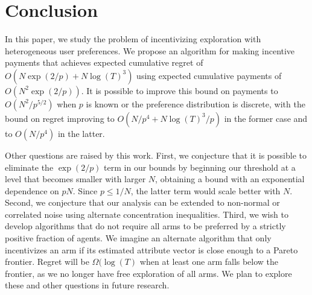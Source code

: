 \section{Conclusion}
In this paper, we study the problem of incentivizing exploration with heterogeneous user preferences.  We propose an algorithm for making incentive payments that achieves  expected cumulative regret of $O(N\exp(2/p) + N \log(T)^3)$ using expected cumulative payments of $O(N^2 \exp(2/p))$.  It is possible to improve this bound on payments to $O(N^2 / p^{5/2})$ when $p$ is known or the preference distribution is discrete, with the bound on regret improving to $O(N/p^4 + N \log(T)^3 / p)$ in the former case and to $O(N/p^4)$ in the latter.

Other questions are raised by this work.  First, we conjecture that it is possible to eliminate the $\exp(2/p)$ term in our bounds by beginning our threshold at a level that becomes smaller with larger $N$, obtaining a bound with an exponential dependence on $pN$.  Since $p \le 1/N$, the latter term would scale better with $N$.
Second, we conjecture that our analysis can be extended to non-normal or correlated noise using alternate concentration inequalities. 
Third, we wish to develop algorithms that do not require all arms to be preferred by a strictly positive fraction of agents.  We imagine an alternate algorithm that only incentivizes an arm if its estimated attribute vector is close enough to a Pareto frontier.  
Regret will be $\Omega(\log(T)$ when at least one arm falls below the frontier, as we no longer have free exploration of all arms.  
We plan to explore these and other questions in future research.
